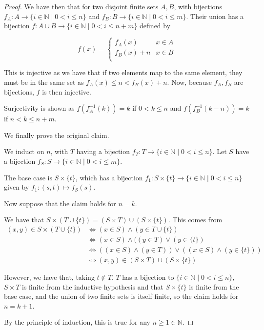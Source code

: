 \documentclass[12pt,letterpaper]{article}
\theoremstyle{definition}
\newcommand{\N}{\mathbb{N}}
\begin{document}
\begin{proof}
    We have then that for two disjoint finite sets $A, B$, with bijections
    $f_A: A \rightarrow \{i \in \N \mid 0 < i \leq n\}$ and $f_B: B \rightarrow \{i \in \N \mid 0 < i \leq m\}$.
    Their union has a bijection $f: A\cup B \rightarrow \{i \in \N \mid 0 < i \leq n+m\}$
    defined by

    \[
    f(x) = \begin{cases}
        f_A(x) & x \in A \\
        f_B(x) + n & x \in B \\
    \end{cases}
    \]

    This is injective as we have that if two elements map to the same element,
    they must be in the same set as $f_A(x) \leq n < f_B(x) + n$. Now,
    because $f_A, f_B$ are bijections, $f$ is then injective.

    Surjectivity is shown as $f(f_A^{-1}(k)) = k$ if $0 < k \leq n$ and $f(f_B^{-1}(k-n)) = k$ if $n < k \leq n+m$.

    We finally prove the original claim.

    We induct on $n$, with $T$ having a bijection $f_T: T \rightarrow \{i \in \N \mid 0 < i \leq n\}$.
    Let $S$ have a bijection $f_S: S \rightarrow \{i \in \N \mid 0 < i \leq m\}$.

    The base case is $S \times \{t\}$, which has a bijection $f_1: S\times \{t\} \rightarrow  \{i \in \N \mid 0 < i \leq n\}$
    given by $f_1: (s,t) \mapsto f_S(s)$.

    Now suppose that the claim holds for $n = k$.

    We have that $S \times (T \cup \{t\}) = (S \times T) \cup (S \times \{t\})$.
    This comes from 
    \begin{align*}
        (x,y) \in S \times (T \cup \{t\}) &\iff (x \in S) \land (y \in T \cup \{t\}) \\
        &\iff (x \in S) \land ((y \in T) \lor (y \in \{t\}) \\
        &\iff ((x \in S) \land (y \in T)) \lor ((x\in S) \land (y \in \{t\})) \\
        &\iff (x,y) \in (S \times T) \cup (S \times \{t\})
    \end{align*}

    However, we have that, taking $t \notin T$, $T$ has a bijection to 
    $\{i \in \N \mid 0 < i \leq n\}$, $S \times T$ is finite from the inductive hypothesis and that
    $S \times \{t\}$ is finite from the base case, and the union of two finite sets
    is itself finite, so the claim holds for $n = k+1$.

    By the principle of induction, this is true for any $n \geq 1 \in \N$.
\end{proof}
\end{document}
